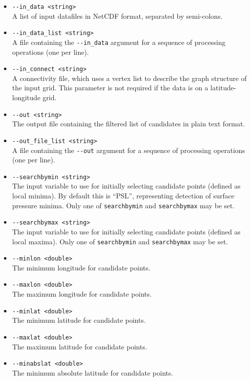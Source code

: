\documentclass[gmdd, hvmath]{copernicus}
\begin{document}
\begin{itemize}
\item[] \texttt{-\;\!\!-in\_data <string>} \\ A list of input datafiles in NetCDF format, separated by semi-colons.
\item[] \texttt{-\;\!\!-in\_data\_list <string>} \\ A file containing the \texttt{-\;\!\!-in\_data} argument for a sequence of processing operations (one per line).
\item[] \texttt{-\;\!\!-in\_connect <string>} \\ A connectivity file, which uses a vertex list to describe the graph structure of the input grid.  This parameter is not required if the data is on a latitude-longitude grid.
\item[] \texttt{-\;\!\!-out <string>} \\ The output file containing the filtered list of candidates in plain text format.
\item[] \texttt{-\;\!\!-out\_file\_list <string>} \\ A file containing the \texttt{-\;\!\!-out} argument for a sequence of processing operations (one per line).
\item[] \texttt{-\;\!\!-searchbymin <string>} \\ The input variable to use for initially selecting candidate points (defined as local minima).  By default this is ``PSL'', representing detection of surface pressure minima.  Only one of \texttt{searchbymin} and \texttt{searchbymax} may be set.
\item[] \texttt{-\;\!\!-searchbymax <string>} \\ The input variable to use for initially selecting candidate points (defined as local maxima).  Only one of \texttt{searchbymin} and \texttt{searchbymax} may be set.
\item[] \texttt{-\;\!\!-minlon <double>} \\ The minimum longitude for candidate points.
\item[] \texttt{-\;\!\!-maxlon <double>} \\ The maximum longitude for candidate points.
\item[] \texttt{-\;\!\!-minlat <double>} \\ The minimum latitude for candidate points.
\item[] \texttt{-\;\!\!-maxlat <double>} \\ The maximum latitude for candidate points.
\item[] \texttt{-\;\!\!-minabslat <double>} \\ The minimum absolute latitude for candidate points.

\end{itemize}
\end{document}
